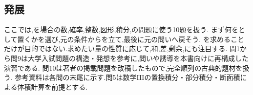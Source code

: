 \subsection{発展}\label{節：発展}
ここでは,を場合の数,確率,整数,図形,積分,の問題に使う10題を扱う.
まず何をとして置くかを選び,元の条件からを立て,最後に元の問いへ戻そう.
を求めることだけが目的ではない.求めたい量の性質に応じて,和,差,剰余,にも注目する.
問1から問9は大学入試問題の構造・発想を参考に,問いや誘導を本書向けに再構成した演習である.
問10は著者の掲載問題を改稿したもので,完全順列の古典的題材を扱う.
参考資料は各問の末尾に示す.問5は数学IIIの置換積分・部分積分・断面積による体積計算を前提とする.

